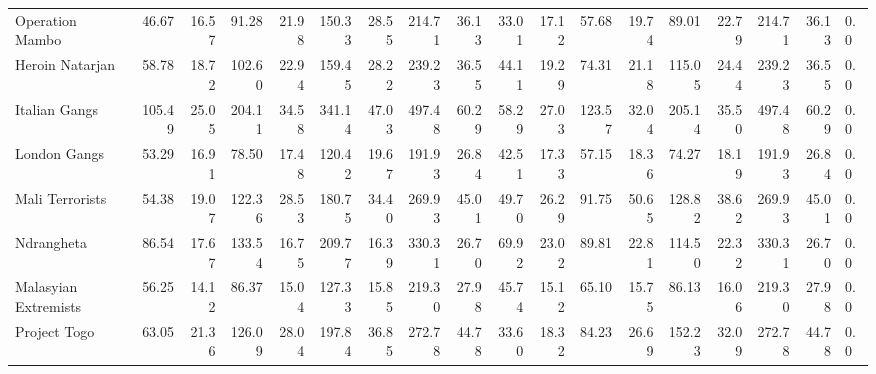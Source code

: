 \begin{tabular}{lrrrrrrrrrrrrrrrrl}
Operation Mambo      &             46.67 &  16.57 &   91.28 &  21.98 &  150.33 &  28.55 &  214.71 &  36.13 &            33.01 &   17.12 &   57.68 &   19.74 &   89.01 &   22.79 &  214.71 &  36.13 &        0.0 \\
Heroin Natarjan      &             58.78 &  18.72 &  102.60 &  22.94 &  159.45 &  28.22 &  239.23 &  36.55 &            44.11 &   19.29 &   74.31 &   21.18 &  115.05 &   24.44 &  239.23 &  36.55 &        0.0 \\
Italian Gangs        &            105.49 &  25.05 &  204.11 &  34.58 &  341.14 &  47.03 &  497.48 &  60.29 &            58.29 &   27.03 &  123.57 &   32.04 &  205.14 &   35.50 &  497.48 &  60.29 &        0.0 \\
London Gangs         &             53.29 &  16.91 &   78.50 &  17.48 &  120.42 &  19.67 &  191.93 &  26.84 &            42.51 &   17.33 &   57.15 &   18.36 &   74.27 &   18.19 &  191.93 &  26.84 &        0.0 \\
Mali Terrorists      &             54.38 &  19.07 &  122.36 &  28.53 &  180.75 &  34.40 &  269.93 &  45.01 &            49.70 &   26.29 &   91.75 &   50.65 &  128.82 &   38.62 &  269.93 &  45.01 &        0.0 \\
Ndrangheta           &             86.54 &  17.67 &  133.54 &  16.75 &  209.77 &  16.39 &  330.31 &  26.70 &            69.92 &   23.02 &   89.81 &   22.81 &  114.50 &   22.32 &  330.31 &  26.70 &        0.0 \\
Malasyian Extremists &             56.25 &  14.12 &   86.37 &  15.04 &  127.33 &  15.85 &  219.30 &  27.98 &            45.74 &   15.12 &   65.10 &   15.75 &   86.13 &   16.06 &  219.30 &  27.98 &        0.0 \\
Project Togo         &             63.05 &  21.36 &  126.09 &  28.04 &  197.84 &  36.85 &  272.78 &  44.78 &            33.60 &   18.32 &   84.23 &   26.69 &  152.23 &   32.09 &  272.78 &  44.78 &        0.0 \\
\bottomrule
\end{tabular}

